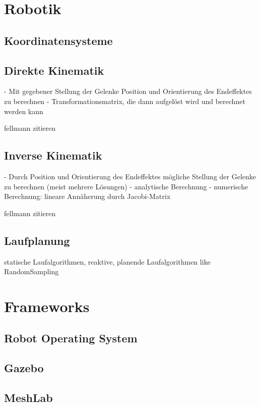 \section{Robotik}

\subsection{Koordinatensysteme}
\subsection{Direkte Kinematik}

- Mit gegebener Stellung der Gelenke Position und Orientierung des Endeffektes zu berechnen
- Transformationsmatrix, die dann aufgelöst wird und berechnet werden kann

fellmann zitieren

\autocite{fellmann2007}

\subsection{Inverse Kinematik}

- Durch Position und Orientierung des Endeffektes mögliche Stellung der Gelenke zu berechnen (meist mehrere Lösungen)
- analytische Berechnung
- numerische Berechnung: lineare Annäherung durch Jacobi-Matrix

fellmann zitieren

\autocite{fellmann2007}

\subsection{Laufplanung}

statische Laufalgorithmen, reaktive, planende Laufalgorithmen like RandomSampling

\section{Frameworks}

\subsection{Robot Operating System}
\subsection{Gazebo}
\subsection{MeshLab}